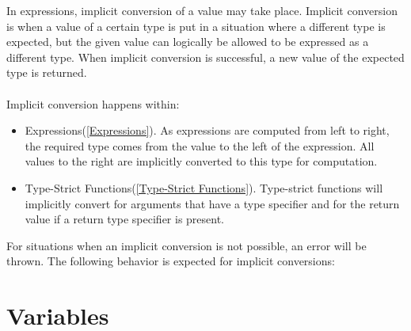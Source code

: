 \documentclass[12pt,letterpaper]{report}
\begin{document}
In expressions, implicit conversion of a value may take place. Implicit conversion is when 
a value of a certain type is put in a situation where a different type is expected, but the 
given value can logically be allowed to be expressed as a different type. When implicit 
conversion is successful, a new value of the expected type is returned.
\\\\
Implicit conversion happens within:
\begin{itemize}
  \item Expressions(\autoref{Expressions}). As expressions are computed from left to right, the required type comes from the value to the left of the expression. All values to the right are implicitly converted to this type for computation.
  \item Type-Strict Functions(\autoref{Type-Strict Functions}). Type-strict functions will implicitly convert for arguments that have a type specifier and for the return value if a return type specifier is present.
\end{itemize}

For situations when an implicit conversion is not possible, an error will be thrown.
The following behavior is expected for implicit conversions:




\chapter{Variables}\label{Variables}
\end{document}
